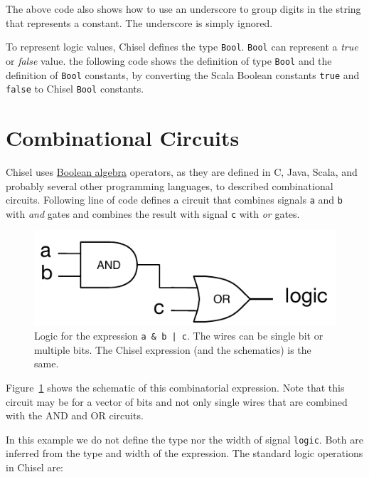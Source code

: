 \documentclass[%
    10pt, %
    headinclude, footexclude,
    openright, %
    notitlepage,
    cleardoubleempty,
    headsepline,
    pointlessnumbers,
    bibtotoc, idxtotoc,
    ]{scrbook}
\newcommand{\code}[1]{{\small{\texttt{#1}}}}
\newcommand{\myref}[2]{\href{#1}{#2}}
\begin{document}


\noindent The above code also shows how to use an underscore to group digits in the
string that represents a constant. The underscore is simply ignored.

To represent logic values, Chisel defines the type \code{Bool}.
\code{Bool} can represent a \emph{true} or \emph{false} value.
the following code shows the definition of type \code{Bool} and the definition of
\code{Bool} constants, by converting the Scala Boolean constants \code{true}
and \code{false} to Chisel \code{Bool} constants.




\section{Combinational Circuits}

Chisel uses \myref{https://en.wikipedia.org/wiki/Boolean_algebra}{Boolean algebra} operators,
as they are defined in C, Java, Scala, and probably several other programming languages,
to described combinational circuits.
Following line of code defines a circuit that combines signals \code{a} and \code{b} with \emph{and}
gates and combines the result with signal \code{c} with \emph{or} gates.



\begin{figure}
  \centering
  \includegraphics[scale=0.7]{figures/logic}
  \caption{Logic for the expression \code{a \& b | c}.
  The wires can be single bit or multiple bits. The Chisel expression (and the schematics) is the same.}
  \label{fig:logic}
\end{figure}


Figure~\ref{fig:logic} shows the schematic of this combinatorial expression.
Note that this circuit may be for a vector of bits and not only single wires
that are combined with the AND and OR circuits.

In this example we do not define the type nor the width of signal \code{logic}.
Both are inferred from the type and width of the expression.
The standard logic operations in Chisel are:
\end{document}

